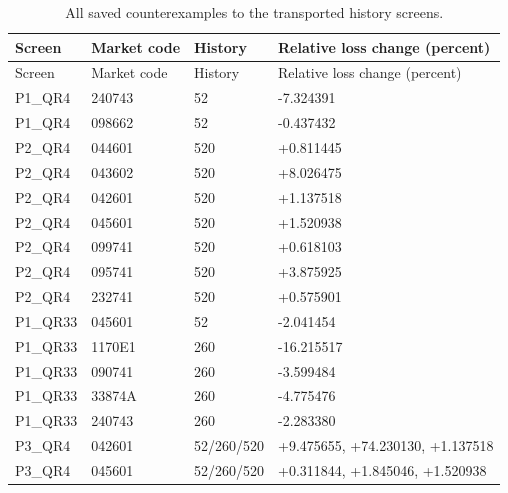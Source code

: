 \begin{longtable}{lllp{7.5cm}}

\caption{All saved counterexamples to the transported history screens.}\label{tab:submission-wp2-counterexamples}\\

\toprule Screen & Market code & History & Relative loss change (percent)\\\midrule\endfirsthead

\toprule Screen & Market code & History & Relative loss change (percent)\\\midrule\endhead

P1\_QR4 & 240743 & 52 & -7.324391\\

P1\_QR4 & 098662 & 52 & -0.437432\\

P2\_QR4 & 044601 & 520 & +0.811445\\

P2\_QR4 & 043602 & 520 & +8.026475\\

P2\_QR4 & 042601 & 520 & +1.137518\\

P2\_QR4 & 045601 & 520 & +1.520938\\

P2\_QR4 & 099741 & 520 & +0.618103\\

P2\_QR4 & 095741 & 520 & +3.875925\\

P2\_QR4 & 232741 & 520 & +0.575901\\

P1\_QR33 & 045601 & 52 & -2.041454\\

P1\_QR33 & 1170E1 & 260 & -16.215517\\

P1\_QR33 & 090741 & 260 & -3.599484\\

P1\_QR33 & 33874A & 260 & -4.775476\\

P1\_QR33 & 240743 & 260 & -2.283380\\

P3\_QR4 & 042601 & 52/260/520 & +9.475655, +74.230130, +1.137518\\

P3\_QR4 & 045601 & 52/260/520 & +0.311844, +1.845046, +1.520938\\


\end{longtable}
